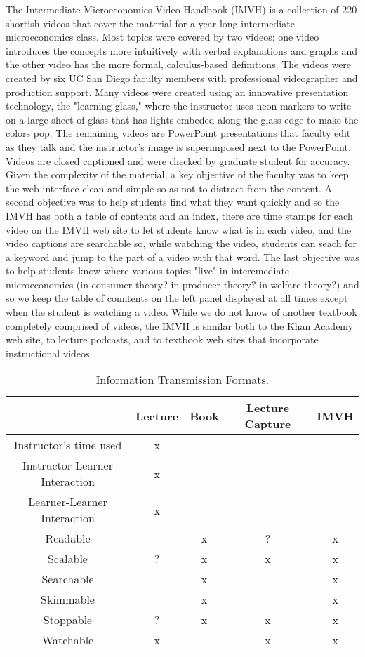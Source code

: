 \documentclass[12pt]{article}
\begin{document}
The Intermediate Microeconomics Video Handbook (IMVH) is a collection of 220 shortish videos that cover the material for a year-long intermediate microeconomics class. Most topics were covered by two videos: one video introduces the concepts more intuitively with verbal explanations and graphs and the other video has the more formal, calculus-based definitions. The videos were created by six UC San Diego faculty members with professional videographer and production support. Many videos were created using an innovative presentation technology, the "learning glass," where the instructor uses neon markers to write on a large sheet of glass that has lights embeded along the glass edge to make the colors pop. The remaining videos are PowerPoint presentations that faculty edit as they talk and the instructor's image is superimposed next to the PowerPoint. Videos are closed captioned and were checked by graduate student for accuracy. Given the complexity of the material, a key objective of the faculty was to keep the web interface clean and simple so as not to distract from the content. A second objective was to help students find what they want quickly and so the IMVH has both a table of contents and an index, there are time stamps for each video on the IMVH web site to let students know what is in each video, and the video captions are searchable so, while watching the video, students can seach for a keyword and jump to the part of a video with that word. The last objective was to help students know where various topics "live" in interemediate microeconomics (in consumer theory?  in producer theory? in welfare theory?) and so we keep the table of conntents on the left panel displayed at all times except when the student is watching a video. While we do not know of another textbook completely comprised of videos, the IMVH is similar both to the Khan Academy web site, to lecture podcasts, and to textbook web sites that incorporate instructional videos.


\begin{table}
	\caption{Information Transmission Formats.}
	\centering
	\begin{tabular}{c|c|c|c|c}
		\hline
		& Lecture & Book & Lecture Capture & IMVH\\
		\hline
		Instructor's time used & x & & &\\
		Instructor-Learner Interaction & x & & &\\
		Learner-Learner Interaction & x & & & \\
		Readable & & x & ? & x \\
		Scalable & ? & x & x & x\\
		Searchable & & x & & x \\
		Skimmable & & x & & x\\
		Stoppable & ? & x & x & x\\
		Watchable & x & & x & x\\

		\hline

	\end{tabular}
	\label{infotransmission}
\end{table}
\end{document}

